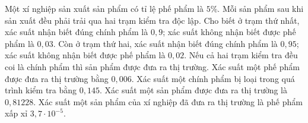 \begin{ex}
Một xí nghiệp sản xuất sản phẩm có tỉ lệ phế phẩm là $5\%$. Mỗi sản phẩm sau khi sản xuất đều phải trải qua hai trạm kiểm tra độc lập. Cho biết ở trạm thứ nhất, xác suất nhận biết đúng chính phẩm là $0{,}9$; xác suất không nhận biết được phế phẩm là $0{,}03$. Còn ở trạm thứ hai, xác suất nhận biết đúng chính phẩm là $0{,}95$; xác suất không nhận biết được phế phẩm là $0{,}02$. Nếu cả hai trạm kiểm tra đều coi là chính phẩm thì sản phẩm được đưa ra thị trường.
\choiceTF
{Xác suất một phế phẩm được đưa ra thị trường bằng $0{,}006$.}
{\True Xác suất một chính phẩm bị loại trong quá trình kiểm tra bằng $0{,}145$.}
{\True Xác suất một sản phẩm được đưa ra thị trường là $0{,}81228$.}
{\True Xác suất một sản phẩm của xí nghiệp đã đưa ra thị trường là phế phẩm xấp xỉ $3{,}7\cdot10^{-5}$.}
\end{ex}
